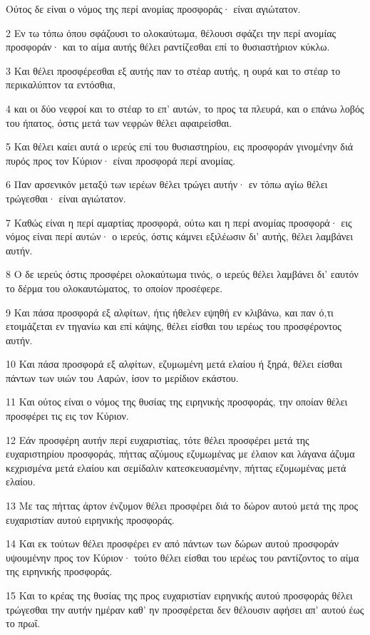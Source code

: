 \par Ούτος δε είναι ο νόμος της περί ανομίας προσφοράς· είναι αγιώτατον.
\par 2 Εν τω τόπω όπου σφάζουσι το ολοκαύτωμα, θέλουσι σφάζει την περί ανομίας προσφοράν· και το αίμα αυτής θέλει ραντίζεσθαι επί το θυσιαστήριον κύκλω.
\par 3 Και θέλει προσφέρεσθαι εξ αυτής παν το στέαρ αυτής, η ουρά και το στέαρ το περικαλύπτον τα εντόσθια,
\par 4 και οι δύο νεφροί και το στέαρ το επ' αυτών, το προς τα πλευρά, και ο επάνω λοβός του ήπατος, όστις μετά των νεφρών θέλει αφαιρείσθαι.
\par 5 Και θέλει καίει αυτά ο ιερεύς επί του θυσιαστηρίου, εις προσφοράν γινομένην διά πυρός προς τον Κύριον· είναι προσφορά περί ανομίας.
\par 6 Παν αρσενικόν μεταξύ των ιερέων θέλει τρώγει αυτήν· εν τόπω αγίω θέλει τρώγεσθαι· είναι αγιώτατον.
\par 7 Καθώς είναι η περί αμαρτίας προσφορά, ούτω και η περί ανομίας προσφορά· εις νόμος είναι περί αυτών· ο ιερεύς, όστις κάμνει εξιλέωσιν δι' αυτής, θέλει λαμβάνει αυτήν.
\par 8 Ο δε ιερεύς όστις προσφέρει ολοκαύτωμα τινός, ο ιερεύς θέλει λαμβάνει δι' εαυτόν το δέρμα του ολοκαυτώματος, το οποίον προσέφερε.
\par 9 Και πάσα προσφορά εξ αλφίτων, ήτις ήθελεν εψηθή εν κλιβάνω, και παν ό,τι ετοιμάζεται εν τηγανίω και επί κάψης, θέλει είσθαι του ιερέως του προσφέροντος αυτήν.
\par 10 Και πάσα προσφορά εξ αλφίτων, εζυμωμένη μετά ελαίου ή ξηρά, θέλει είσθαι πάντων των υιών του Ααρών, ίσον το μερίδιον εκάστου.
\par 11 Και ούτος είναι ο νόμος της θυσίας της ειρηνικής προσφοράς, την οποίαν θέλει προσφέρει τις εις τον Κύριον.
\par 12 Εάν προσφέρη αυτήν περί ευχαριστίας, τότε θέλει προσφέρει μετά της ευχαριστηρίου προσφοράς, πήττας αζύμους εζυμωμένας με έλαιον και λάγανα άζυμα κεχρισμένα μετά ελαίου και σεμίδαλιν κατεσκευασμένην, πήττας εζυμωμένας μετά ελαίου.
\par 13 Με τας πήττας άρτον ένζυμον θέλει προσφέρει διά το δώρον αυτού μετά της προς ευχαριστίαν αυτού ειρηνικής προσφοράς.
\par 14 Και εκ τούτων θέλει προσφέρει εν από πάντων των δώρων αυτού προσφοράν υψουμένην προς τον Κύριον· τούτο θέλει είσθαι του ιερέως του ραντίζοντος το αίμα της ειρηνικής προσφοράς.
\par 15 Και το κρέας της θυσίας της προς ευχαριστίαν ειρηνικής αυτού προσφοράς θέλει τρώγεσθαι την αυτήν ημέραν καθ' ην προσφέρεται δεν θέλουσιν αφήσει απ' αυτού έως το πρωΐ.
